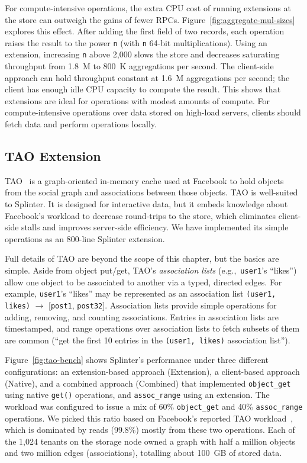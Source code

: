For compute-intensive operations, the extra CPU cost of
running extensions at the store can outweigh the gains of fewer RPCs.
Figure~\ref{fig:aggregate-mul-sizes} explores this effect.
After adding the first field of two records, each operation raises the
  result to the power \texttt{n} (with \texttt{n} 64-bit
  multiplications).
Using an extension, increasing \texttt{n} above 2,000
  slows the store and decreases
  saturating throughput from 1.8~M to 800~K aggregations per second.
The client-side approach can hold throughput constant
  at 1.6~M aggregations per second;
the client has enough idle CPU capacity to compute the result.
This shows that extensions are ideal for operations with
  modest amounts of compute.
For compute-intensive operations over data stored on high-load servers,
  clients should fetch data and perform operations locally.

\subsection{TAO Extension}

TAO~\cite{tao-2013} is a graph-oriented in-memory cache used at Facebook to hold
  objects from the social graph and associations between those objects.
TAO is well-suited to Splinter.
It is designed for interactive data, but it embeds knowledge
  about Facebook's workload to decrease round-trips to the store, which
  eliminates client-side stalls and improves server-side efficiency.
We have implemented its simple operations as an 800-line Splinter extension.

Full details of TAO are beyond the scope of this chapter, but the basics are
  simple. Aside from object put/get, TAO's \textsl{association lists}
(e.g.,\
  \texttt{user1}'s ``likes'') allow one object to be
  associated to another via a typed, directed edges.
For example, \texttt{user1}'s ``likes'' may be represented as an association list
  \texttt{(user1, likes)} $\rightarrow$ [\texttt{post1}, \texttt{post32}].
Association lists provide simple operations for adding, removing, and counting
  associations. Entries in association lists are timestamped, and range operations
  over association lists to fetch subsets of them are common (``get the first 10 entries in
  the \texttt{(user1, likes)} association list'').

Figure~\ref{fig:tao-bench} shows Splinter's performance under three
different configurations: an extension-based approach (Extension), a
client-based approach (Native), and a combined approach (Combined) that implemented
\texttt{object\_get} using native \texttt{get()} operations, and
\texttt{assoc\_range} using an extension.
The workload was configured to
issue a mix of 60\%
  \texttt{object\_get} and 40\% \texttt{assoc\_range} operations.
We picked this ratio based on Facebook's reported TAO workload~\cite{tao-2013},
  which is dominated by reads (99.8\%) mostly from these two operations.
Each of the 1,024 tenants on the storage node owned a graph with half a million
  objects and two million edges (associations), totalling about 100~GB of
  stored data.

